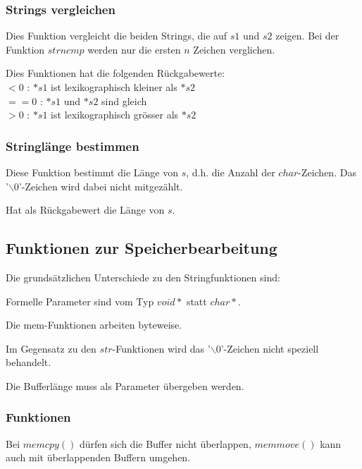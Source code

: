		\begin{minipage}[t]{9 cm}
			\subsubsection{Strings vergleichen }
				
				\begin{compactitem}
					\item Dies Funktion vergleicht die beiden Strings, die auf $s1$ und $s2$ zeigen. Bei der Funktion $strncmp$ werden nur die ersten $n$ Zeichen verglichen.
					\item Dies Funktionen hat die folgenden Rückgabewerte: \\
						$<0$ : $*s1$ ist lexikographisch kleiner als $*s2$ \\
						$==0$ : $*s1$ und $*s2$ sind gleich \\
						$>0$ : $*s1$ ist lexikographisch grösser als $*s2$						
				\end{compactitem}
				
			\subsubsection{Stringlänge bestimmen }
				
				\begin{compactitem}
					\item Diese Funktion bestimmt die Länge von $s$, d.h. die Anzahl der $char$-Zeichen. Das '$\backslash0$'-Zeichen wird dabei nicht mitgezählt.
					\item Hat als Rückgabewert die Länge von $s$.
				\end{compactitem}
		\end{minipage}
		
		\subsection{Funktionen zur Speicherbearbeitung }
			Die grundsätzlichen Unterschiede zu den Stringfunktionen sind:
			\begin{compactitem}
				\item Formelle Parameter sind vom Typ $void*$ statt $char*$.
				\item Die mem-Funktionen arbeiten byteweise.
				\item Im Gegensatz zu den $str$-Funktionen wird das '$\backslash0$'-Zeichen nicht speziell behandelt.
				\item Die Bufferlänge muss als Parameter übergeben werden.
			\end{compactitem}
			
			\subsubsection{Funktionen }
				
				Bei $memcpy()$ dürfen sich die Buffer nicht überlappen, $memmove()$ kann auch mit überlappenden Buffern umgehen.\\